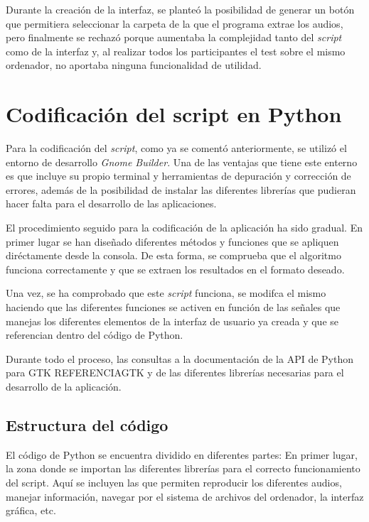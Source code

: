 \documentclass[11pt,a4paper,twoside]{book}
\begin{document}
            Durante la creación de la interfaz, se planteó la posibilidad de generar un botón que permitiera seleccionar la carpeta de la que el programa extrae los audios, pero finalmente se rechazó porque aumentaba la complejidad tanto del \textit{script} como de la interfaz y, al realizar todos los participantes el test sobre el mismo ordenador, no aportaba ninguna funcionalidad de utilidad.
            
        \section{Codificación del script en Python}
            Para la codificación del \textit{script}, como ya se comentó anteriormente, se utilizó el entorno de desarrollo \textit{Gnome Builder}. Una de las ventajas que tiene este enterno es que incluye su propio terminal y herramientas de depuración y corrección de errores, además de la posibilidad de instalar las diferentes librerías que pudieran hacer falta para el desarrollo de las aplicaciones.
            
            El procedimiento seguido para la codificación de la aplicación ha sido gradual. En primer lugar se han diseñado diferentes métodos y funciones que se apliquen diréctamente desde la consola. De esta forma, se comprueba que el algoritmo funciona correctamente y que se extraen los resultados en el formato deseado.
            
            Una vez, se ha comprobado que este \textit{script} funciona, se modifca el mismo haciendo que las diferentes funciones se activen en función de las señales que manejas los diferentes elementos de la interfaz de usuario ya creada y que se referencian dentro del código de Python.
            
            Durante todo el proceso, las consultas a la documentación de la API de Python para GTK REFERENCIAGTK y de las diferentes librerías necesarias para el desarrollo de la aplicación.
            
            \subsection{Estructura del código}
                El código de Python se encuentra dividido en diferentes partes:
                En primer lugar, la zona donde se importan las diferentes librerías para el correcto funcionamiento del script. Aquí se incluyen las que permiten reproducir los diferentes audios, manejar información, navegar por el sistema de archivos del ordenador, la interfaz gráfica, etc.
                
\end{document}
